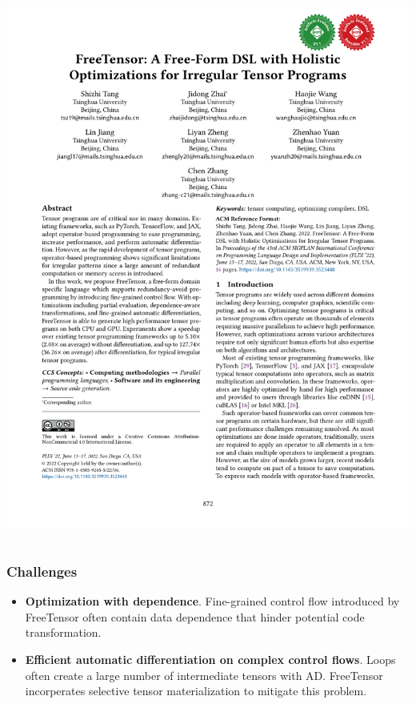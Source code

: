 \documentclass[12pt,aspectratio=169]{beamer}
\begin{document}
\begin{frame}
\begin{columns}
\begin{column}{0.4\textwidth}
                \includegraphics[page=3,trim=11cm 11cm 2cm 3cm,clip,scale=.62]{paper.pdf}
            \end{column}
        \end{columns}
    \end{frame}

    \begin{frame}
        \frametitle{Challenges}

        \begin{itemize}
            \setlength{\itemsep}{.8em}
            \item \textbf{Optimization with dependence}. Fine-grained control flow introduced by FreeTensor often contain data dependence that hinder potential code transformation.
            \item \textbf{Efficient automatic differentiation on complex control flows}. Loops often create a large number of intermediate tensors with AD. FreeTensor incorperates selective tensor materialization to mitigate this problem.
        \end{itemize}
    \end{frame}
\end{document}

